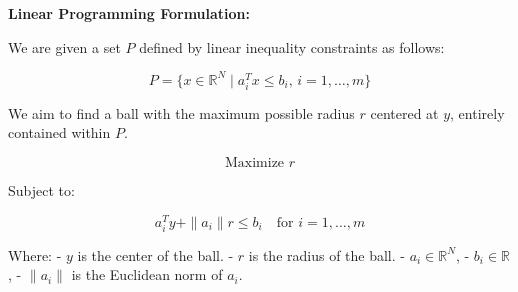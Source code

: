 \documentclass{article}
\begin{document}
\textbf{Linear Programming Formulation:}

We are given a set \( P \) defined by linear inequality constraints as follows:

\[
P = \{ x \in \mathbb{R}^N \mid a_i^T x \leq b_i, \, i = 1, \ldots, m \}
\]

We aim to find a ball with the maximum possible radius \( r \) centered at \( y \), entirely contained within \( P \).

\[
\text{Maximize } r
\]

Subject to:

\[
a_i^T y + \|a_i\| r \leq b_i \quad \text{for } i = 1, \ldots, m
\]

Where:
- \( y \) is the center of the ball.
- \( r \) is the radius of the ball.
- \( a_i \in \mathbb{R}^N \),
- \( b_i \in \mathbb{R} \),
- \(\|a_i\|\) is the Euclidean norm of \( a_i \).
\end{document}
